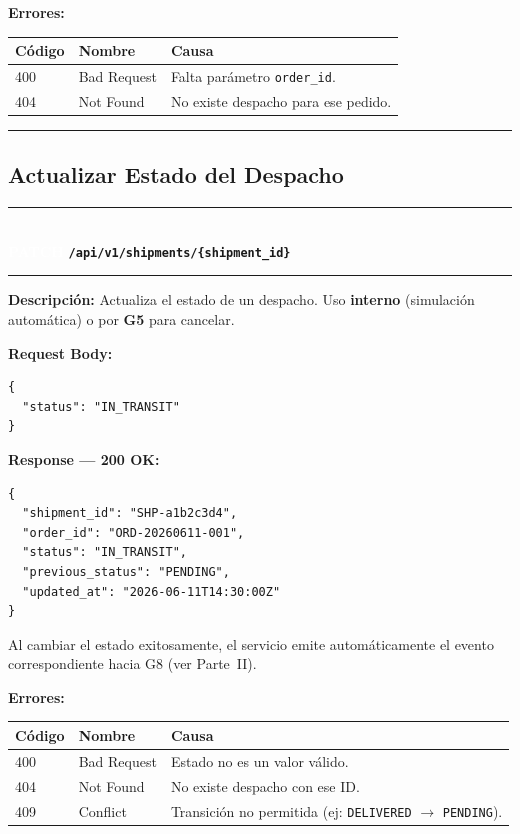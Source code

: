 \documentclass[11pt, a4paper]{article}
\newcommand{\httpmethod}[2]{%
  \colorbox{#1}{\textcolor{white}{\textbf{\small\textsf{#2}}}}%
}
\newcommand{\routeheader}[3]{%
  \noindent\rule{\textwidth}{1.5pt}\\[0.3em]
  \httpmethod{#1}{#2}\;\texttt{\bfseries #3}\\[0.3em]
  \rule{\textwidth}{0.4pt}
  \vspace{0.3cm}
}
\begin{document}
\textbf{Errores:}
\begin{table}[h!]
\small
\begin{tabularx}{\textwidth}{l l X}
  \toprule
  \textbf{Código} & \textbf{Nombre} & \textbf{Causa} \\
  \midrule
  400 & Bad Request & Falta parámetro \texttt{order\_id}. \\
  404 & Not Found   & No existe despacho para ese pedido. \\
  \bottomrule
\end{tabularx}
\end{table}

\noindent\rule{\textwidth}{0.4pt}

\subsection{Actualizar Estado del Despacho}

\routeheader{patch}{PATCH}{/api/v1/shipments/\{shipment\_id\}}

\textbf{Descripción:} Actualiza el estado de un despacho. Uso \textbf{interno}
(simulación automática) o por \textbf{G5} para cancelar.

\vspace{0.3cm}
\textbf{Request Body:}

\begin{lstlisting}
{
  "status": "IN_TRANSIT"
}
\end{lstlisting}

\textbf{Response --- 200 OK:}

\begin{lstlisting}
{
  "shipment_id": "SHP-a1b2c3d4",
  "order_id": "ORD-20260611-001",
  "status": "IN_TRANSIT",
  "previous_status": "PENDING",
  "updated_at": "2026-06-11T14:30:00Z"
}
\end{lstlisting}

\begin{infobox}
  Al cambiar el estado exitosamente, el servicio emite automáticamente
  el evento correspondiente hacia G8 (ver Parte~II).
\end{infobox}

\textbf{Errores:}
\begin{table}[h!]
\small
\begin{tabularx}{\textwidth}{l l X}
  \toprule
  \textbf{Código} & \textbf{Nombre} & \textbf{Causa} \\
  \midrule
  400 & Bad Request & Estado no es un valor válido. \\
  404 & Not Found   & No existe despacho con ese ID. \\
  409 & Conflict    & Transición no permitida (ej: \texttt{DELIVERED} $\rightarrow$ \texttt{PENDING}). \\
  \bottomrule
\end{tabularx}
\end{table}
\end{document}
